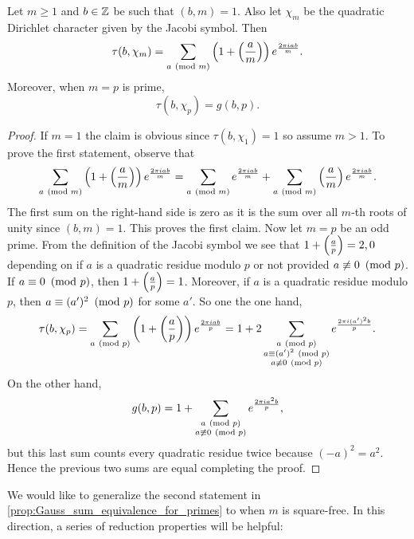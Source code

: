       \begin{proposition}\label{prop:Gauss_sum_equivalence_for_primes}
        Let $m \ge 1$ and $b \in \mathbb{Z}$ be such that $(b,m) = 1$. Also let $\chi_{m}$ be the quadratic Dirichlet character given by the Jacobi symbol. Then
        \[
          \tau(b,\chi_{m}) = \sum_{a \ \left(\text{mod }m\right)}\left(1+\left(\frac{a}{m}\right)\right)e^{\frac{2\pi iab}{m}}.
        \]
        Moreover, when $m = p$ is prime,
        \[
          \tau(b,\chi_{p}) = g(b,p).
        \]
      \end{proposition}
      \begin{proof}
        If $m = 1$ the claim is obvious since $\tau(b,\chi_{1}) = 1$ so assume $m > 1$. To prove the first statement, observe that
        \[
          \sum_{a \ \left(\text{mod }m\right)}\left(1+\left(\frac{a}{m}\right)\right)e^{\frac{2\pi iab}{m}} = \sum_{a \ \left(\text{mod }m\right)}e^{\frac{2\pi iab}{m}}+\sum_{a \ \left(\text{mod }m\right)}\left(\frac{a}{m}\right)e^{\frac{2\pi iab}{m}}.
        \]
        The first sum on the right-hand side is zero as it is the sum over all $m$-th roots of unity since $(b,m) = 1$. This proves the first claim. Now let $m = p$ be an odd prime. From the definition of the Jacobi symbol we see that $1+\textstyle{\left(\frac{a}{p}\right)} = 2,0$ depending on if $a$ is a quadratic residue modulo $p$ or not provided $a \not\equiv 0 \ \left(\text{mod }p\right)$. If $a \equiv 0 \ \left(\text{mod }p\right)$, then $1+\textstyle{\left(\frac{a}{p}\right)} = 1$. Moreover, if $a$ is a quadratic residue modulo $p$, then $a \equiv (a')^{2} \ \left(\text{mod }p\right)$ for some $a'$. So one the one hand,
        \[
          \tau(b,\chi_{p}) = \sum_{a \ \left(\text{mod }p\right)}\left(1+\left(\frac{a}{p}\right)\right)e^{\frac{2\pi iab}{p}} = 1+2\sum_{\substack{a \ \left(\text{mod }p\right) \\ a \equiv (a')^{2} \ \left(\text{mod }p\right) \\ a \not\equiv 0 \ \left(\text{mod }p\right)}}e^{\frac{2\pi i(a')^{2}b}{p}}.
        \]
        On the other hand,
        \[
          g(b,p) = 1+\sum_{\substack{a \ \left(\text{mod }p\right) \\ a \not\equiv 0 \ \left(\text{mod }p\right)}}e^{\frac{2\pi ia^{2}b}{p}},
        \]
        but this last sum counts every quadratic residue twice because $(-a)^{2} = a^{2}$. Hence the previous two sums are equal completing the proof.
      \end{proof}

      We would like to generalize the second statement in \cref{prop:Gauss_sum_equivalence_for_primes} to when $m$ is square-free. In this direction, a series of reduction properties will be helpful:

